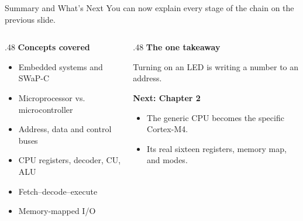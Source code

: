 \documentclass[9pt,aspectratio=169,xcolor=table]{beamer}
\begin{document}
\begin{frame}{Summary and What's Next}
    \leavevmode
    {\small You can now explain every stage of the chain on the
    previous slide.}

    \vspace{3mm}
    \begin{columns}[T]
    \begin{column}{.48\textwidth}
        \textbf{Concepts covered}
        \begin{itemize}\itemsep1pt
            \item Embedded systems and SWaP-C
            \item Microprocessor vs. microcontroller
            \item Address, data and control buses
            \item CPU registers, decoder, CU, ALU
            \item Fetch--decode--execute
            \item Memory-mapped I/O
        \end{itemize}
    \end{column}
    \begin{column}{.48\textwidth}
        \textbf{The one takeaway}
        \begin{block}{}
            \alert{Turning on an LED is writing a number to an address.}
        \end{block}

        \vspace{2mm}
        \textbf{Next: Chapter 2}
        \begin{itemize}\itemsep1pt
            \item The generic CPU becomes the specific Cortex-M4.
            \item Its real sixteen registers, memory map, and modes.
        \end{itemize}
    \end{column}
    \end{columns}
\end{frame}
\end{document}
